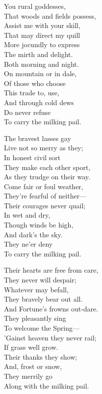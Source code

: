 \settowidth{\versewidth}{That woods and fields possess,}
\begin{dcverse}
\begin{patverse}
You rural goddesses,\\
That woods and fields possess,\\
Assist me with your skill,\\
That may direct my quill\\
More jocundly to express\\
The mirth and delight.\\
Both morning and night.\\
On mountain or in dale,\\
Of those who choose\\
This trade to, use,\\
And through cold dews\\
Do never refuse\\
To carry the milking pail.
\end{patverse}

\begin{patverse}
The bravest lasses gay\\
Live not so merry as they;\\
In honest civil sort\\
They make each other sport,\\
As they trudge on their way.\\
Come fair or foul weather,\\
They’re fearful of neither—\\
Their courages never quail;\\
In wet and dry,\\
Though winds be high,\\
And dark’s the sky.\\
They ne’er deny\\
To carry the milking pail.
\end{patverse}

\begin{patverse}
Their hearts are free from care,\\
They never will despair;\\
Whatever may befall,\\
They bravely bear out all.\\
And Fortune’s frowns out-dare.\\
They pleasantly sing\\
To welcome the Spring—\\
’Gainst heaven they never rail;\\
If grass well grow.\\
Their thanks they show;\\
And, frost or snow,\\
They merrily go\\
Along with the milking pail.
\end{patverse}
\end{dcverse}
\pagebreak

